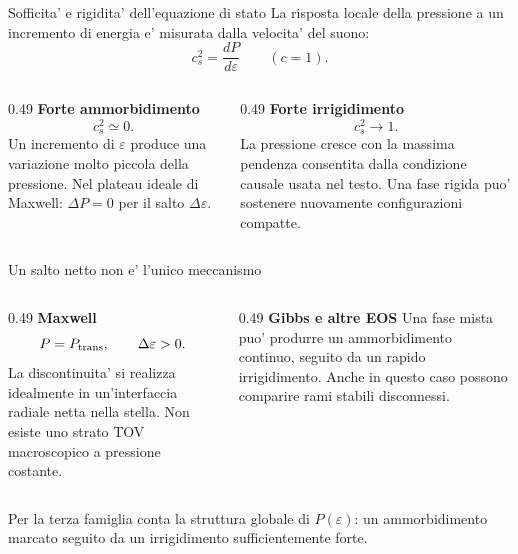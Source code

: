 \begin{frame}{Sofficita' e rigidita' dell'equazione di stato}
\small
La risposta locale della pressione a un incremento di energia e' misurata dalla velocita' del suono:
\[
c_s^2=\frac{dP}{d\varepsilon}\qquad(c=1).
\]
\begin{columns}[T,onlytextwidth]
\begin{column}{0.49\textwidth}
\textbf{Forte ammorbidimento}
\[
c_s^2\simeq0.
\]
Un incremento di $\varepsilon$ produce una variazione molto piccola della pressione.
\medskip
Nel plateau ideale di Maxwell: $\Delta P=0$ per il salto $\Delta\varepsilon$.
\end{column}
\begin{column}{0.49\textwidth}
\textbf{Forte irrigidimento}
\[
c_s^2\longrightarrow1.
\]
La pressione cresce con la massima pendenza consentita dalla condizione causale usata nel testo.
\medskip
Una fase rigida puo' sostenere nuovamente configurazioni compatte.
\end{column}
\end{columns}
\end{frame}

\begin{frame}{Un salto netto non e' l'unico meccanismo}
\small
\begin{columns}[T,onlytextwidth]
\begin{column}{0.49\textwidth}
\textbf{Maxwell}
\[
P=P_{\rm trans},\qquad
\Delta\varepsilon>0.
\]
La discontinuita' si realizza idealmente in un'interfaccia radiale netta nella stella.
\medskip
Non esiste uno strato TOV macroscopico a pressione costante.
\end{column}
\begin{column}{0.49\textwidth}
\textbf{Gibbs e altre EOS}
\medskip
Una fase mista puo' produrre un ammorbidimento continuo, seguito da un rapido irrigidimento.
\medskip
Anche in questo caso possono comparire rami stabili disconnessi.
\end{column}
\end{columns}
\medskip
Per la terza famiglia conta la struttura globale di $P(\varepsilon)$: un ammorbidimento marcato seguito da un irrigidimento sufficientemente forte.
\end{frame}

